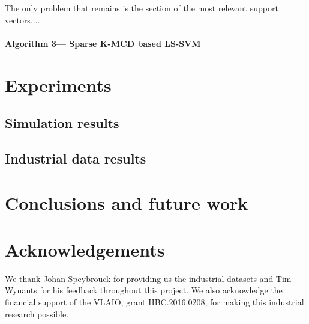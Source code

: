 \documentclass[preprint,12pt]{elsarticle}
\begin{document}
The only problem that remains is the section of the most relevant support vectors....

\paragraph{Algorithm 3--- Sparse K-MCD based LS-SVM}

\section{Experiments} 
\subsection{Simulation results} 
\subsection{Industrial data results} 

\section{Conclusions and future work}

\section*{Acknowledgements}

We thank Johan Speybrouck for providing us the industrial datasets and Tim Wynants for his feedback throughout this project. We also acknowledge the financial support of the VLAIO, grant HBC.2016.0208, for making this industrial research possible.













\end{document}
